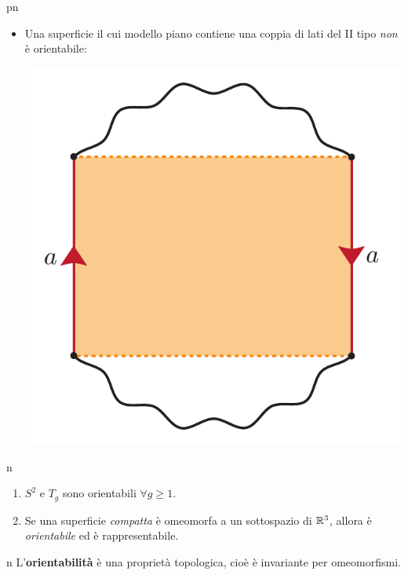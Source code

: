 \begin{example}{pn}
\begin{itemize}
\begin{center}
		\end{center}
	\item Una superficie il cui modello piano contiene una coppia di lati del II tipo \textit{non} è orientabile:
	\begin{center}
		\includegraphics[trim=0cm 0cm 0cm 0cm, clip, scale=0.35]{images/generalmoebius.pdf}
	\end{center}
	\end{itemize}
\end{example}
\begin{remark}{n}~{}
	\begin{enumerate}
		\item $S^2$ e $T_g$ sono orientabili $\forall g\geq 1$.
		\item Se una superficie \textit{compatta} è omeomorfa a un sottospazio di $\mathbb{R}^3$, allora è \textit{orientabile} ed è rappresentabile.
	\end{enumerate}
\end{remark}
\begin{remark}{n}
	L'\textbf{orientabilità} è una proprietà topologica, cioè è invariante per omeomorfismi.
\end{remark}
